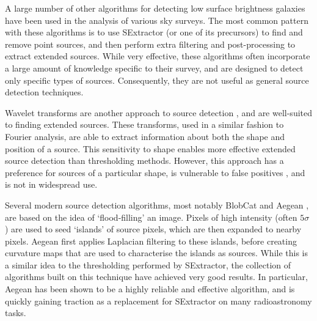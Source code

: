 A large number of other algorithms for detecting low surface brightness galaxies have been used \cite{kniazev2004low} \cite{walsh2009invisibles} \cite{strauss2002spectroscopic} in the analysis of various sky surveys. The most common pattern with these algorithms is to use SExtractor (or one of its precursors) to find and remove point sources, and then perform extra filtering and post-processing to extract extended sources. While very effective, these algorithms often incorporate a large amount of knowledge specific to their survey, and are designed to detect only specific types of sources. Consequently, they are not useful as general source detection techniques.


Wavelet transforms are another approach to source detection \cite{damiani1997method} \cite{fruscione2006ciao}, and are well-suited to finding extended sources. These transforms, used in a similar fashion to Fourier analysis, are able to extract information about both the shape and position of a source. This sensitivity to shape enables more effective extended source detection than thresholding methods. However, this approach has a preference for sources of a particular shape, is vulnerable to false positives \cite{valtchanov2001comparison}, and is not in widespread use.

Several modern source detection algorithms, most notably BlobCat \cite{hales2012blobcat} and Aegean \cite{aegean}, are based on the idea of `flood-filling' an image. Pixels of high intensity (often $5\sigma$ \cite{aegean}) are used to seed `islands' of source pixels, which are then expanded to nearby pixels. Aegean first applies Laplacian filtering to these islands, before creating curvature maps that are used to characterise the islands as sources. While this is a similar idea to the thresholding performed by SExtractor, the collection of algorithms built on this technique have achieved very good results. In particular, Aegean has been shown to be a highly reliable and effective algorithm, and is quickly gaining traction as a replacement for SExtractor on many radioastronomy tasks.

